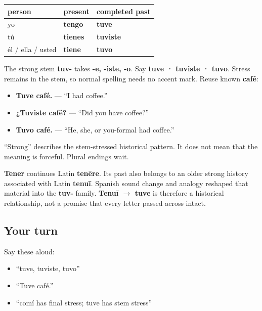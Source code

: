 \begin{grammarlens}[title={Grammar Lens: one strong singular pattern}]
\noindent
\begin{tabularx}{\linewidth}{@{}>{\raggedright\arraybackslash}X>{\raggedright\arraybackslash}X>{\raggedright\arraybackslash}X@{}}
\toprule
\textbf{person} & \textbf{present} & \textbf{completed past} \\
\midrule
yo & \textbf{tengo} & \textbf{tuve} \\
tú & \textbf{tienes} & \textbf{tuviste} \\
él / ella / usted & \textbf{tiene} & \textbf{tuvo} \\
\bottomrule
\end{tabularx}

The strong stem \textbf{tuv-} takes \textbf{-e, -iste, -o}. Say \textbf{tuve · tuviste · tuvo}. Stress remains in the stem, so normal spelling needs no accent mark. Reuse known \textbf{café}:

\begin{itemize}
\raggedright
  \item \textbf{Tuve café.} — “I had coffee.”
  \item \textbf{¿Tuviste café?} — “Did you have coffee?”
  \item \textbf{Tuvo café.} — “He, she, or you-formal had coffee.”
\end{itemize}

“Strong” describes the stem-stressed historical pattern. It does not mean that the meaning is forceful. Plural endings wait.
\end{grammarlens}

\begin{cousinweb}
\textbf{Tener} continues Latin \textbf{tenēre}. Its past also belongs to an older strong history associated with Latin \textbf{tenuī}. Spanish sound change and analogy reshaped that material into the \textbf{tuv-} family. \textbf{Tenuī $\to$ tuve} is therefore a historical relationship, not a promise that every letter passed across intact.
\end{cousinweb}

\subsection*{Your turn}
Say these aloud:

\begin{itemize}
\raggedright
  \item “tuve, tuviste, tuvo”
  \item “Tuve café.”
  \item “comí has final stress; tuve has stem stress”
\end{itemize}


